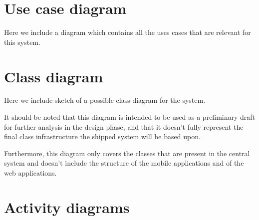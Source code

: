 \section{Use case diagram}
Here we include a diagram which contains all the uses cases that are relevant for this system.
\begin{landscape}

\end{landscape}


\section{Class diagram}
Here we include sketch of a possible class diagram for the system. 

It should be noted that this diagram is intended to be used as a preliminary draft for further analysis in the design phase, and that it doesn’t fully represent the final class infrastructure the shipped system will be based upon.

Furthermore, this diagram only covers the classes that are present in the central system and doesn’t include the structure of the mobile applications and of the web applications.

\begin{landscape}
%

\end{landscape}


\section{Activity diagrams}
